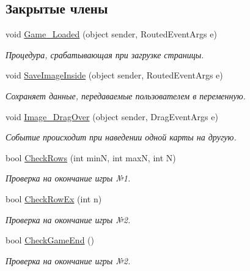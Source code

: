 \subsection*{Закрытые члены}
\begin{DoxyCompactItemize}
\item 
void \hyperlink{class_pasyans_cover_u_w_p_1_1_game_page_ac8a85033f2127c25b60c0f0c82e7eefb}{Game\+\_\+\+Loaded} (object sender, Routed\+Event\+Args e)
\begin{DoxyCompactList}\small\item\em Процедура, срабатывающая при загрузке страницы. \end{DoxyCompactList}\item 
void \hyperlink{class_pasyans_cover_u_w_p_1_1_game_page_a4d7e48fd54d238c77192dc04fb3f64a4}{Save\+Image\+Inside} (object sender, Routed\+Event\+Args e)
\begin{DoxyCompactList}\small\item\em Сохраняет данные, передаваемые пользователем в переменную. \end{DoxyCompactList}\item 
void \hyperlink{class_pasyans_cover_u_w_p_1_1_game_page_a573a74360ad3cd3f0b191668a7c69e93}{Image\+\_\+\+Drag\+Over} (object sender, Drag\+Event\+Args e)
\begin{DoxyCompactList}\small\item\em Событие происходит при наведении одной карты на другую. \end{DoxyCompactList}\item 
bool \hyperlink{class_pasyans_cover_u_w_p_1_1_game_page_a03b4af2d9a04735bbc7e7d6331d220d4}{Check\+Rows} (int minN, int maxN, int N)
\begin{DoxyCompactList}\small\item\em Проверка на окончание игры №1. \end{DoxyCompactList}\item 
bool \hyperlink{class_pasyans_cover_u_w_p_1_1_game_page_acfb646ae22c904f6afb4b226b7d8188e}{Check\+Row\+Ex} (int n)
\begin{DoxyCompactList}\small\item\em Проверка на окончание игры №2. \end{DoxyCompactList}\item 
bool \hyperlink{class_pasyans_cover_u_w_p_1_1_game_page_add7dd4a8c8e74aa19f6042801eb45da3}{Check\+Game\+End} ()
\begin{DoxyCompactList}\small\item\em Проверка на окончание игры №2. \end{DoxyCompactList}\item 

\end{DoxyCompactItemize}
